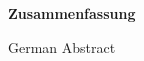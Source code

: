 



\cleardoublepage



\vspace*{2cm}
\begin{center}
{\Large \bf Zusammenfassung}
\end{center}
\vspace{1cm}

German Abstract

